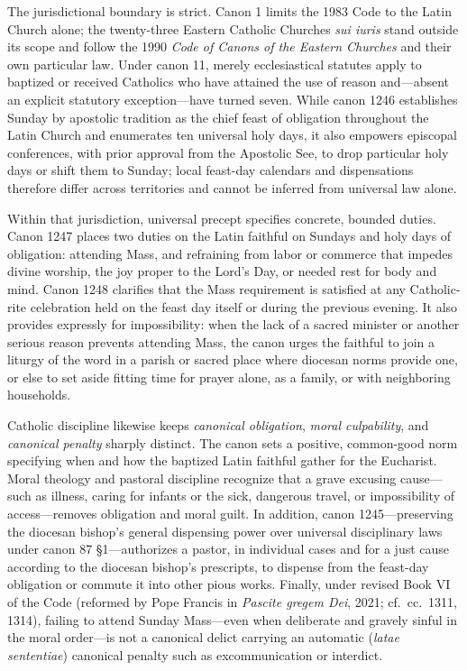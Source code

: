 The jurisdictional boundary is strict. Canon 1 limits the 1983 Code to the Latin Church alone; the twenty-three Eastern Catholic Churches \emph{sui iuris} stand outside its scope and follow the 1990 \emph{Code of Canons of the Eastern Churches} and their own particular law. Under canon 11, merely ecclesiastical statutes apply to baptized or received Catholics who have attained the use of reason and---absent an explicit statutory exception---have turned seven. While canon 1246 establishes Sunday by apostolic tradition as the chief feast of obligation throughout the Latin Church and enumerates ten universal holy days, it also empowers episcopal conferences, with prior approval from the Apostolic See, to drop particular holy days or shift them to Sunday; local feast-day calendars and dispensations therefore differ across territories and cannot be inferred from universal law alone.

Within that jurisdiction, universal precept specifies concrete, bounded duties. Canon 1247 places two duties on the Latin faithful on Sundays and holy days of obligation: attending Mass, and refraining from labor or commerce that impedes divine worship, the joy proper to the Lord's Day, or needed rest for body and mind. Canon 1248 clarifies that the Mass requirement is satisfied at any Catholic-rite celebration held on the feast day itself or during the previous evening. It also provides expressly for impossibility: when the lack of a sacred minister or another serious reason prevents attending Mass, the canon urges the faithful to join a liturgy of the word in a parish or sacred place where diocesan norms provide one, or else to set aside fitting time for prayer alone, as a family, or with neighboring households.

Catholic discipline likewise keeps \emph{canonical obligation}, \emph{moral culpability}, and \emph{canonical penalty} sharply distinct. The canon sets a positive, common-good norm specifying when and how the baptized Latin faithful gather for the Eucharist. Moral theology and pastoral discipline recognize that a grave excusing cause---such as illness, caring for infants or the sick, dangerous travel, or impossibility of access---removes obligation and moral guilt. In addition, canon 1245---preserving the diocesan bishop's general dispensing power over universal disciplinary laws under canon 87 \S 1---authorizes a pastor, in individual cases and for a just cause according to the diocesan bishop's prescripts, to dispense from the feast-day obligation or commute it into other pious works. Finally, under revised Book VI of the Code (reformed by Pope Francis in \emph{Pascite gregem Dei}, 2021; cf.\ cc.\ 1311, 1314), failing to attend Sunday Mass---even when deliberate and gravely sinful in the moral order---is not a canonical delict carrying an automatic (\emph{latae sententiae}) canonical penalty such as excommunication or interdict.

